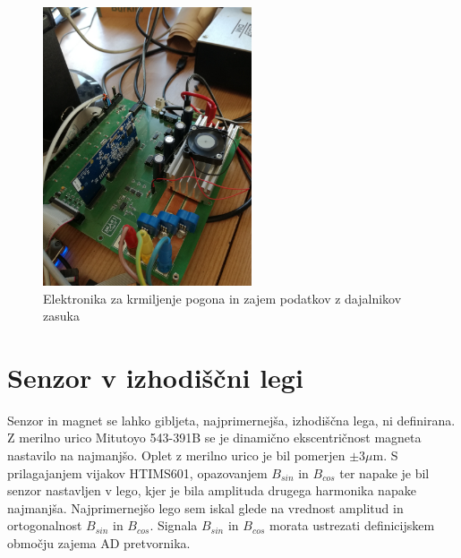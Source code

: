 \begin{figure}[!ht]
	\centering
	\includegraphics[width=0.55\textwidth]{./Slike/krmilnaplosca.jpg}
	\caption{Elektronika za krmiljenje pogona in zajem podatkov z dajalnikov zasuka}
	\label{krmilnaplosca.jpg}
\end{figure}
\newpage
\section{Senzor v izhodiščni legi}
Senzor in magnet se lahko gibljeta, najprimernejša, izhodiščna lega, ni definirana. Z merilno urico Mitutoyo 543-391B se je dinamično ekscentričnost magneta nastavilo na najmanjšo. Oplet z merilno urico je bil pomerjen $\pm 3 \mu\mathrm{m}$.
S prilagajanjem vijakov HTIMS601, opazovanjem $B_{sin}$ in $B_{cos}$ ter napake je bil senzor nastavljen v lego, kjer je bila amplituda drugega harmonika napake najmanjša. Najprimernejšo lego sem iskal glede na vrednost amplitud in ortogonalnost  $B_{sin}$ in $B_{cos}$. Signala $B_{sin}$ in $B_{cos}$ morata ustrezati definicijskem območju zajema AD pretvornika.

